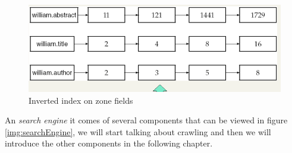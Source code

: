 \begin{figure}
    \caption{Inverted index on zone fields}
    \label{img:zoneIndex}
    \includegraphics[width=\textwidth]{Images/zoneIndex}
\end{figure}

An \emph{search engine} it comes of several components that can be viewed in figure \ref{img:searchEngine}, 
we will start talking about crawling and then we will introduce the other components in the following chapter.


